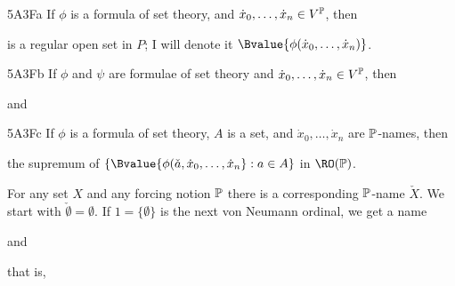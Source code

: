 \spheader 5A3Fa If $\phi$ is a
formula of set theory, and $\dot x_0,\ldots,\dot x_n\in V^{\Bbb P}$, then


\noindent is a regular open set in $P$;
I will denote it $\Bvalue{\phi(\dot x_0,\ldots,\dot x_n)}$.

\spheader 5A3Fb If $\phi$ and $\psi$ are formulae of set theory
and $\dot x_0,\ldots,\dot x_n\in V^{\Bbb P}$, then


\noindent and



\spheader 5A3Fc If $\phi$ is a formula of set theory, $A$ is a set,
and $\dot x_0,\ldots,\dot x_n$ are $\Bbb P$-names, then


\noindent the supremum of
$\{{\Bvalue{\phi(\check a,\dot x_0,\ldots,\dot x_n}}:a\in A\}$ in
$\RO(\Bbb P)$.  

For any set $X$ and any forcing notion $\Bbb P$ there is a
corresponding $\Bbb P$-name $\check X$.   We start with
$\check\emptyset=\emptyset$.   If $1=\{\emptyset\}$ is the next von Neumann
ordinal, we get a name


\noindent and


\noindent that is,


